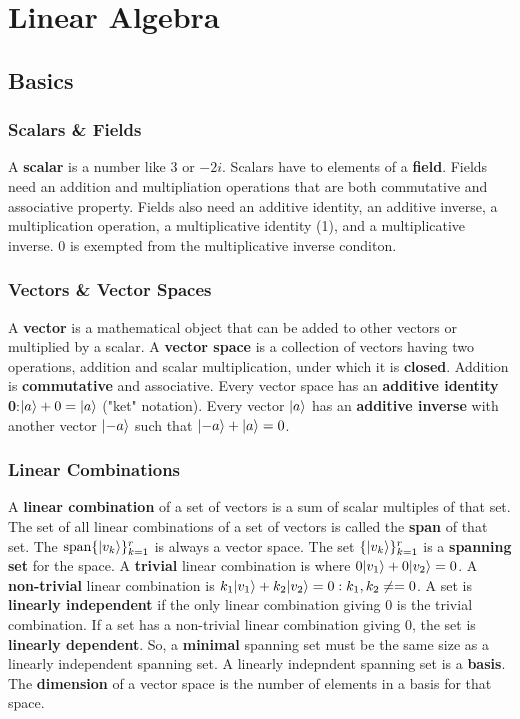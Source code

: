 \documentclass[../main.tex]{subfiles}
\DeclarePairedDelimiter\ket{\lvert}{\rangle}
\begin{document}
\chapter{Linear Algebra}
\section{Basics}
\subsection{Scalars \& Fields}
A \textbf{scalar} is a number like $3$ or $-2i$. Scalars have to elements of
a \textbf{field}. Fields need an addition and multipliation operations that are
both commutative and associative property. Fields also need an additive identity, 
an additive inverse, a multiplication operation, a multiplicative identity (1),
and a multiplicative inverse. $0$ is exempted from the multiplicative inverse conditon.

\subsection{Vectors \& Vector Spaces}
A \textbf{vector} is a mathematical object that can be added to other vectors or multiplied
by a scalar. A \textbf{vector space} is a collection of vectors having two
operations, addition and scalar multiplication, under which it is \textbf{closed}.
Addition is \textbf{commutative} and associative. Every vector space has an 
\textbf{additive identity 0}:$\ket{a}+0=\ket{a}$ ("ket" notation). Every vector
$\ket{a}$ has an \textbf{additive inverse} with another vector $\ket{-a}$ such that $\ket{-a}+\ket{a}=0$. 

\subsection{Linear Combinations}
A \textbf{linear combination} of a set of vectors is a sum of scalar multiples of that set.
The set of all linear combinations of a set of vectors is called the \textbf{span} of that set.
The $\text{span}\{\ket{v_{k}}\}_{k=1}^{r}$ is always a vector space. The set $\{\ket{v_{k}}\}_{k=1}^{r}$
is a \textbf{spanning set} for the space. A \textbf{trivial} linear combination is where $0\ket{v_{1}}+0\ket{v_{2}}=0$.
A \textbf{non-trivial} linear combination is $k_{1}\ket{v_{1}}+k_{2}\ket{v_{2}}=0:k_{1},k_{2}\neq = 0$.
A set is \textbf{linearly independent} if the only linear combination giving $0$ is the trivial combination.
If a set has a non-trivial linear combination giving $0$, the set is \textbf{linearly dependent}. So, a \textbf{minimal}
spanning set must be the same size as a linearly independent spanning set. A linearly indepndent spanning set is a
\textbf{basis}. The \textbf{dimension} of a vector space is the number of elements in a basis for that space.
\end{document}
